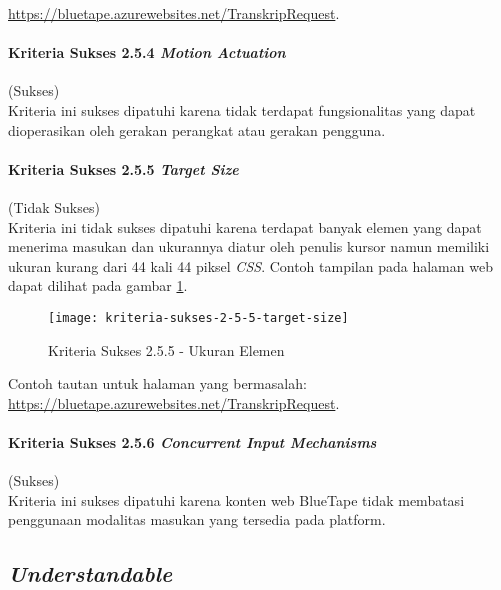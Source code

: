 \url{https://bluetape.azurewebsites.net/TranskripRequest}.

\paragraph{Kriteria Sukses 2.5.4 \textit{Motion Actuation}}
\label{par:kepatuhan_bluetape_kriteria_sukses_2.5.4}
(Sukses)\\

Kriteria ini sukses dipatuhi karena tidak terdapat fungsionalitas yang dapat dioperasikan oleh gerakan perangkat atau gerakan pengguna.

\paragraph{Kriteria Sukses 2.5.5 \textit{Target Size}}
\label{par:kepatuhan_bluetape_kriteria_sukses_2.5.5}
(Tidak Sukses)\\

Kriteria ini tidak sukses dipatuhi karena terdapat banyak elemen yang dapat menerima masukan dan ukurannya diatur oleh penulis kursor namun memiliki ukuran kurang dari 44 kali 44 piksel \textit{CSS}. Contoh tampilan pada halaman web dapat dilihat pada gambar \ref{fig:2.5.5_target_size}. 

\begin{figure}[H]
	\centering  
	\texttt{[image: kriteria-sukses-2-5-5-target-size]}  
    \caption[Kriteria Sukses 2.5.5 - Ukuran Elemen]{Kriteria Sukses 2.5.5 - Ukuran Elemen}
    \label{fig:2.5.5_target_size}  
\end{figure} 
Contoh tautan untuk halaman yang bermasalah: \url{https://bluetape.azurewebsites.net/TranskripRequest}.

\paragraph{Kriteria Sukses 2.5.6 \textit{Concurrent Input Mechanisms}}
\label{par:kepatuhan_bluetape_kriteria_sukses_2.5.6}
(Sukses)\\

Kriteria ini sukses dipatuhi karena konten web BlueTape tidak membatasi penggunaan modalitas masukan yang tersedia pada platform.

\subsection{\textit{Understandable}}
\label{subsec:kepatuhan_bluetape_understandable}

